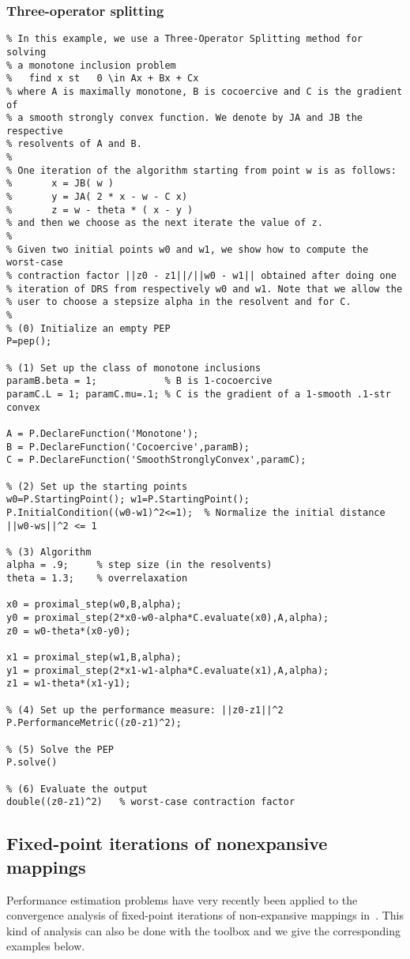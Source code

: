 \documentclass[11pt,a4paper]{article}
\begin{document}
\newpage

\subsubsection{Three-operator splitting}
\begin{lstlisting}
% In this example, we use a Three-Operator Splitting method for solving
% a monotone inclusion problem
%   find x st   0 \in Ax + Bx + Cx
% where A is maximally monotone, B is cocoercive and C is the gradient of 
% a smooth strongly convex function. We denote by JA and JB the respective
% resolvents of A and B.
%
% One iteration of the algorithm starting from point w is as follows:
%       x = JB( w )
%       y = JA( 2 * x - w - C x)
%       z = w - theta * ( x - y )
% and then we choose as the next iterate the value of z.
%
% Given two initial points w0 and w1, we show how to compute the worst-case
% contraction factor ||z0 - z1||/||w0 - w1|| obtained after doing one
% iteration of DRS from respectively w0 and w1. Note that we allow the 
% user to choose a stepsize alpha in the resolvent and for C.
%
% (0) Initialize an empty PEP
P=pep();

% (1) Set up the class of monotone inclusions
paramB.beta = 1;            % B is 1-cocoercive
paramC.L = 1; paramC.mu=.1; % C is the gradient of a 1-smooth .1-str convex

A = P.DeclareFunction('Monotone');
B = P.DeclareFunction('Cocoercive',paramB);
C = P.DeclareFunction('SmoothStronglyConvex',paramC);

% (2) Set up the starting points
w0=P.StartingPoint(); w1=P.StartingPoint();
P.InitialCondition((w0-w1)^2<=1);  % Normalize the initial distance ||w0-ws||^2 <= 1

% (3) Algorithm
alpha = .9;		% step size (in the resolvents)
theta = 1.3;    % overrelaxation

x0 = proximal_step(w0,B,alpha);
y0 = proximal_step(2*x0-w0-alpha*C.evaluate(x0),A,alpha);
z0 = w0-theta*(x0-y0);

x1 = proximal_step(w1,B,alpha);
y1 = proximal_step(2*x1-w1-alpha*C.evaluate(x1),A,alpha);
z1 = w1-theta*(x1-y1);

% (4) Set up the performance measure: ||z0-z1||^2
P.PerformanceMetric((z0-z1)^2);

% (5) Solve the PEP
P.solve()

% (6) Evaluate the output
double((z0-z1)^2)   % worst-case contraction factor
\end{lstlisting}
\newpage
\subsection{Fixed-point iterations of nonexpansive mappings}
Performance estimation problems have very recently been applied to the convergence analysis of fixed-point iterations of non-expansive mappings in~\cite{lieder2017convergence,lieder2018}. This kind of analysis can also be done with the toolbox and we give the corresponding examples below.
\end{document}
